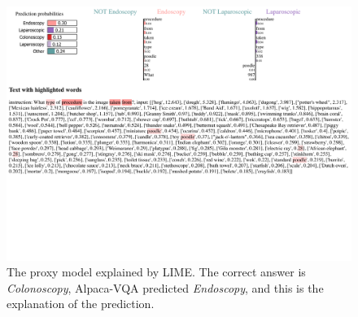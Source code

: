 \begin{figure}[htb]
    \centerline{
    \includegraphics[width=1.3\textwidth]{images/LIME_5.pdf}}
    \caption[The proxy model explained by LIME - 5.]{The proxy model explained by LIME. The correct answer is \textit{Colonoscopy}, Alpaca-VQA predicted \textit{Endoscopy}, and this is the explanation of the prediction.}
    \label{fig:lime_appendix_lime_5}
\end{figure} 